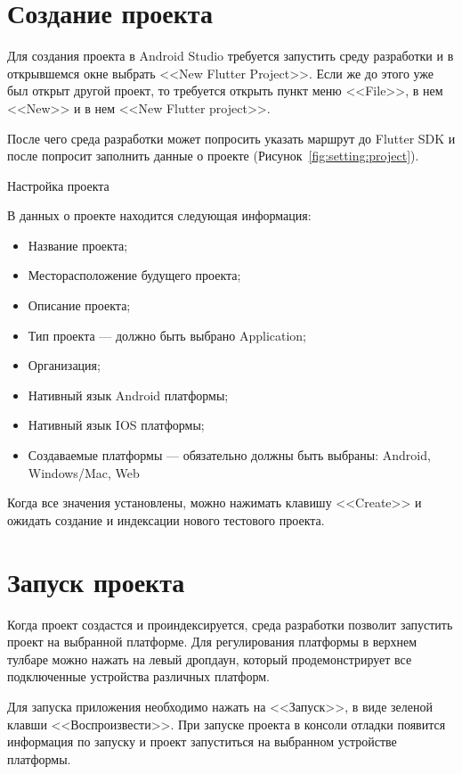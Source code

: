 \clearpage

\section{Создание проекта}

Для создания проекта в Android Studio требуется запустить среду разработки
и в открывшемся окне выбрать <<New Flutter Project>>.
Если же до этого уже был открыт другой проект,
то требуется открыть пункт меню <<File>>, в нем <<New>>
и в нем <<New Flutter project>>.\par
После чего среда разработки может попросить указать маршрут до Flutter SDK
и после попросит заполнить данные о проекте
(Рисунок~\ref{fig:setting:project}).

\begin{image}
	\caption{Настройка проекта}
	\label{fig:setting:project}
\end{image}

В данных о проекте находится следующая информация:

\begin{itemize}
	\item Название проекта;
	\item Месторасположение будущего проекта;
	\item Описание проекта;
	\item Тип проекта --- должно быть выбрано Application;
	\item Организация;
	\item Нативный язык Android платформы;
	\item Нативный язык IOS платформы;
	\item Создаваемые платформы --- обязательно должны быть выбраны:
	Android, Windows/Mac, Web
\end{itemize}

Когда все значения установлены, можно нажимать клавишу <<Create>>
и ожидать создание и индексации нового тестового проекта.
\clearpage
\section{Запуск проекта}

Когда проект создастся и проиндексируется,
среда разработки позволит запустить проект на выбранной платформе.
Для регулирования платформы в верхнем тулбаре можно нажать на левый дропдаун,
который продемонстрирует все подключенные устройства различных платформ.\par
Для запуска приложения необходимо нажать на <<Запуск>>, в виде зеленой клавши
<<Воспроизвести>>.
При запуске проекта в консоли отладки появится информация
по запуску и проект запуститься на выбранном устройстве платформы.

